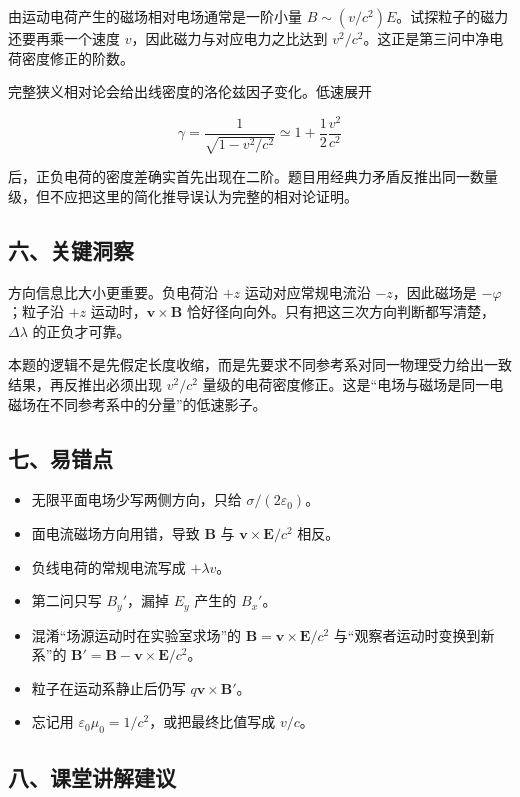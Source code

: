 \documentclass[12pt,a4paper,UTF8]{ctexart}
\newcommand{\tightlist}{\setlength{\itemsep}{0pt}\setlength{\parskip}{0pt}}
\begin{document}
由运动电荷产生的磁场相对电场通常是一阶小量
\(B\sim(v/c^2)E\)。试探粒子的磁力还要再乘一个速度
\(v\)，因此磁力与对应电力之比达到
\(v^2/c^2\)。这正是第三问中净电荷密度修正的阶数。

完整狭义相对论会给出线密度的洛伦兹因子变化。低速展开

\[\gamma=\frac1{\sqrt{1-v^2/c^2}}\simeq1+\frac12\frac{v^2}{c^2}\]

后，正负电荷的密度差确实首先出现在二阶。题目用经典力矛盾反推出同一数量级，但不应把这里的简化推导误认为完整的相对论证明。

\subsection{六、关键洞察}\label{ux516dux5173ux952eux6d1eux5bdf-5}

方向信息比大小更重要。负电荷沿 \(+z\) 运动对应常规电流沿
\(-z\)，因此磁场是 \(-\hat\varphi\)；粒子沿 \(+z\)
运动时，\(\bm v\times\bm B\)
恰好径向向外。只有把这三次方向判断都写清楚，\(\Delta\lambda\)
的正负才可靠。

本题的逻辑不是先假定长度收缩，而是先要求不同参考系对同一物理受力给出一致结果，再反推出必须出现
\(v^2/c^2\)
量级的电荷密度修正。这是``电场与磁场是同一电磁场在不同参考系中的分量''的低速影子。

\subsection{七、易错点}\label{ux4e03ux6613ux9519ux70b9-5}

\begin{itemize}
\tightlist
\item
  无限平面电场少写两侧方向，只给 \(\sigma/(2\varepsilon_0)\)。
\item
  面电流磁场方向用错，导致 \(\bm B\) 与 \(\bm v\times\bm E/c^2\) 相反。
\item
  负线电荷的常规电流写成 \(+\lambda v\)。
\item
  第二问只写 \(B_y'\)，漏掉 \(E_y\) 产生的 \(B_x'\)。
\item
  混淆``场源运动时在实验室求场''的 \(\bm B=\bm v\times\bm E/c^2\)
  与``观察者运动时变换到新系''的 \(\bm B'=\bm B-\bm v\times\bm E/c^2\)。
\item
  粒子在运动系静止后仍写 \(q\bm v\times\bm B'\)。
\item
  忘记用 \(\varepsilon_0\mu_0=1/c^2\)，或把最终比值写成 \(v/c\)。
\end{itemize}

\subsection{八、课堂讲解建议}\label{ux516bux8bfeux5802ux8bb2ux89e3ux5efaux8bae-5}
\end{document}
